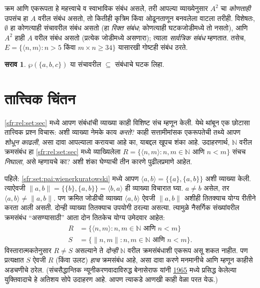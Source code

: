 \documentclass[11pt,a4paper,openany]{book}
\theoremstyle{definition}
\newtheorem{prob}{सराव}[chapter]
\newenvironment{explain}{}{}
\newcommand{\Setabs}[2]{\{#1:#2\}}
\newcommand{\Pow}[1]{\wp(#1)}
\newcommand{\tuple}[1]{\langle #1\rangle}
\newcommand{\Nat}{\mathbb{N}}
\newcommand{\citeyear}[1]{\hyperref[bib:#1]{1965}}
\begin{document}
\begin{explain}
क्रम आणि एकरूपता हे महत्त्वाचे व स्वाभाविक संबंध असले, तरी आपल्या
व्याख्येनुसार $A^{2}$ चा \emph{कोणताही} उपसंच हा $A$ वरील संबंध असतो,
तो कितीही कृत्रिम किंवा ओढूनताणून बनवलेला वाटला तरीही. विशेषतः,
$\emptyset$ हा कोणत्याही संचावरील संबंध असतो (हा \emph{रिक्त संबंध};
कोणत्याही घटकजोडीमध्ये तो नसतो), आणि $A^{2}$ हाही $A$ वरील संबंध असतो
(प्रत्येक जोडीमध्ये असणारा); त्याला \emph{सार्वत्रिक संबंध} म्हणतात.
तसेच, $E=\Setabs{\tuple{n, m}}{n>5 \text{ किंवा } m \times n \ge 34}$
यासारखी गोष्टही संबंध ठरते.
\end{explain}

\begin{prob}
  $\Pow{\{a, b, c\}}$ या संचावरील $\subseteq$ संबंधाचे घटक लिहा.
\end{prob}











\section{तात्त्विक चिंतन}\label{sfr:rel:ref:sec}

\ref{sfr:rel:set:sec} मध्ये आपण संबंधांची व्याख्या काही विशिष्ट संच म्हणून
केली. येथे थांबून एक छोटासा तात्त्विक प्रश्न विचारू: अशी व्याख्या नेमके
काय \emph{करते}? काही सत्तामीमांसक एकरूपतेची तथ्ये आपण \emph{शोधून काढली},
असा दावा आपल्याला करायचा आहे का, याबद्दल खूपच शंका आहे. उदाहरणार्थ,
$\Nat$ वरील क्रमसंबंध हा \ref{sfr:rel:set:sec} मध्ये व्याख्यिलेला
$R=  \Setabs{\tuple{n,m}}{n, m \in \Nat\text{ आणि }
n < m}$ संचच \emph{निघाला}, असे म्हणायचे का? अशी शंका घेण्याची तीन
कारणे पुढीलप्रमाणे आहेत.

पहिले: \ref{sfr:set:pai:wienerkuratowski} मध्ये आपण
$\tuple{a, b} = \{\{a\}, \{a, b\}\}$ अशी व्याख्या केली. त्याऐवजी
$\lVert a,b\rVert = \{\{b\}, \{a, b\}\} = \tuple{b,a}$ ही व्याख्या
विचारात घ्या. $a \neq b$ असेल, तर $\tuple{a, b} \neq \lVert a,b\rVert$.
पण क्रमित जोडीची व्याख्या $\tuple{a,b}$ ऐवजी $\lVert a,b\rVert$ अशीही
तितक्याच योग्य रीतीने करता आली असती. दोन्ही व्याख्या तितक्याच उपयोगी
ठरल्या असत्या. त्यामुळे नैसर्गिक संख्यांवरील क्रमसंबंध ``असण्यासाठी''
आता दोन तितकेच योग्य उमेदवार आहेत:
\begin{align*}
		R &= \Setabs{\tuple{n,m}}{n, m \in \Nat \text{ आणि }n < m}\\
		S &= \Setabs{\lVert n,m\rVert}{n, m \in \Nat \text{ आणि }n < m}.
\end{align*}
विस्तारात्मकतेनुसार $R \neq S$ असल्याने ते \emph{दोन्ही} $\Nat$ वरील
क्रमसंबंधाशी एकरूप असू शकत नाहीत. पण प्रत्यक्षात $S$ ऐवजी $R$ (किंवा
उलट) \emph{हाच} क्रमसंबंध आहे, असा दावा करणे मनमानीचे आणि म्हणून काहीसे
अडचणीचे ठरेल. (संचसैद्धान्तिक न्यूनीकरणवादाविरुद्ध बेनासेराफ यांनी
\citeyear{Benacerraf1965} मध्ये प्रसिद्ध केलेल्या युक्तिवादाचे हे अतिशय
सोपे उदाहरण आहे. आपण त्याकडे आणखी काही वेळा परत येऊ.)
\end{document}

